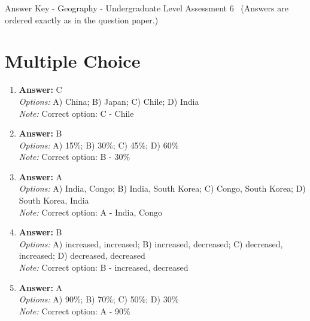 \documentclass[12pt]{article}
\begin{document}
\begin{center}
Answer Key - Geography - Undergraduate Level Assessment 6 \
\small (Answers are ordered exactly as in the question paper.)
\end{center}

\section*{Multiple Choice}
\begin{enumerate}[label=\arabic*.]
\item \textbf{Answer:} C
\\ \textit{Options:} A) China; B) Japan; C) Chile; D) India
\\ \textit{Note:} Correct option: C - Chile
\item \textbf{Answer:} B
\\ \textit{Options:} A) 15\%; B) 30\%; C) 45\%; D) 60\%
\\ \textit{Note:} Correct option: B - 30\%
\item \textbf{Answer:} A
\\ \textit{Options:} A) India, Congo; B) India, South Korea; C) Congo, South Korea; D) South Korea, India
\\ \textit{Note:} Correct option: A - India, Congo
\item \textbf{Answer:} B
\\ \textit{Options:} A) increased, increased; B) increased, decreased; C) decreased, increased; D) decreased, decreased
\\ \textit{Note:} Correct option: B - increased, decreased
\item \textbf{Answer:} A
\\ \textit{Options:} A) 90\%; B) 70\%; C) 50\%; D) 30\%
\\ \textit{Note:} Correct option: A - 90\%
\end{enumerate}
\end{document}
